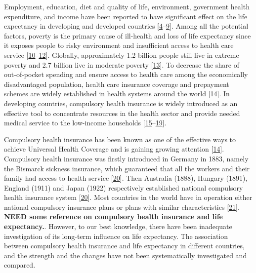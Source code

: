\documentclass[]{elsarticle} %
\begin{document}
Employment, education, diet and quality of life, environment, government health expenditure, and income have been reported to have significant effect on the life expectancy in developing and developed countries {[}\protect\hyperlink{ref-assari2018life}{4}--\protect\hyperlink{ref-wilkinson2018impact}{9}{]}.
Among all the potential factors, poverty is the primary cause of ill-health and loss of life expectancy since it exposes people to risky environment and insufficient access to health care service {[}\protect\hyperlink{ref-world2001dying}{10}--\protect\hyperlink{ref-rehm2018drinking}{12}{]}.
Globally, approximately 1.2 billion people still live in extreme poverty and 2.7 billion live in moderate poverty {[}\protect\hyperlink{ref-olinto2013state}{13}{]}.
To decrease the share of out-of-pocket spending and ensure access to health care among the economically disadvantaged population, health care insurance coverage and prepayment schemes are widely established in health systems around the world {[}\protect\hyperlink{ref-wagstaff2018progress}{14}{]}.
In developing countries, compulsory health insurance is widely introduced as an effective tool to concentrate resources in the health sector and provide needed medical service to the low-income households {[}\protect\hyperlink{ref-abel1992health}{15}--\protect\hyperlink{ref-meng2015consolidating}{19}{]}.

Compulsory health insurance has been known as one of the effective ways to achieve Universal Health Coverage and is gaining growing attention {[}\protect\hyperlink{ref-wagstaff2018progress}{14}{]}. Compulsory health insurance was firstly introduced in Germany in 1883, namely the Bismarck sickness insurance, which guaranteed that all the workers and their family had access to health service {[}\protect\hyperlink{ref-walker1969compulsory}{20}{]}. Then Australia (1888), Hungary (1891), England (1911) and Japan (1922) respectively established national compulsory health insurance system {[}\protect\hyperlink{ref-walker1969compulsory}{20}{]}. Most countries in the world have in operation either national compulsory insurance plans or plans with similar characteristics {[}\protect\hyperlink{ref-healthglance2017}{21}{]}. \textbf{NEED some reference on compulsory health insurance and life expectancy.}. However, to our best knowledge, there have been inadequate investigation of its long-term influence on life expectancy. The association between compulsory health insurance and life expectancy in different countries, and the strength and the changes have not been systematically investigated and compared.
\end{document}
